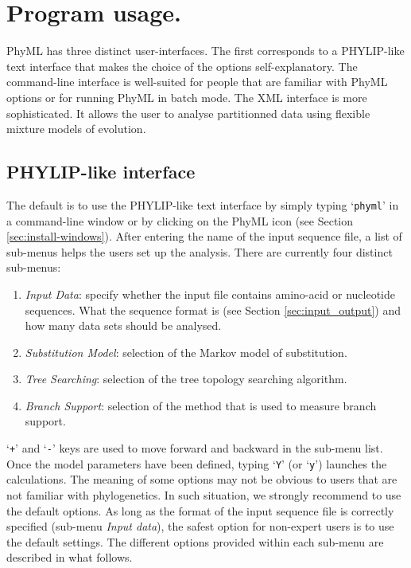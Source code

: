 \documentclass[a4paper,12pt]{article}
\newcommand{\x}[1]{\texttt{#1}}
\begin{document}
\section{Program usage.}\label{sec:phyml_new}

PhyML has  three distinct user-interfaces.   The first corresponds  to a PHYLIP-like  text interface
that makes the choice of the options self-explanatory. The command-line interface is well-suited for
people that are familiar with PhyML options or for running PhyML in batch mode. The XML interface is
more sophisticated. It allows the user to analyse partitionned data using flexible mixture models of evolution.

\subsection{PHYLIP-like interface}

The default is to use the PHYLIP-like  text interface by simply typing `\x{phyml}' in a command-line
window or by clicking on the PhyML icon (see Section \ref{sec:install-windows}).  After entering the
name of the input sequence file, a list of  sub-menus helps the users set up the analysis.  There
are currently four distinct sub-menus:


\begin{enumerate}

\item  {\em  Input  Data}:  specify  whether  the  input  file  contains  amino-acid  or  nucleotide
sequences. What the  sequence format is (see Section \ref{sec:input_output}) and  how many data sets
should be analysed.

\item  {\em  Substitution  Model}: selection  of  the  Markov  model  of substitution.

\item  {\em  Tree Searching}:  selection  of  the tree  topology  searching  algorithm.

\item {\em  Branch Support}: selection  of the method  that is used  to measure branch  support.

\end{enumerate}
\noindent `\x{+}' and `\x{-}' keys are used to  move forward and backward in the sub-menu list. Once
the model parameters  have been defined, typing `\x{Y}' (or `\x{y}')  launches the calculations. The
meaning of  some options may not  be obvious to users  that are not familiar  with phylogenetics. In
such situation, we strongly recommend to use the default options. As long as the format of the input
sequence file is  correctly specified (sub-menu {\em Input data}), the  safest option for non-expert
users  is to  use the  default settings.  The different  options provided  within each  sub-menu are
described in what follows.
\end{document}
